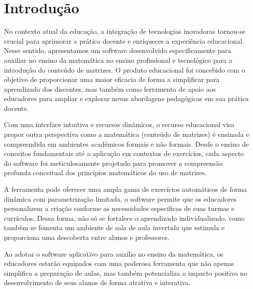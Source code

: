 \chapter{Introdução}
\label{introducao}


No contexto atual da educação, a integração de tecnologias inovadoras tornou-se crucial para aprimorar a prática docente e enriquecer a experiência educacional. Nesse sentido, apresentamos um software desenvolvido especificamente para auxiliar no ensino da matemática no ensino profissional e tecnológico para a introdução do conteúdo de matrizes. O produto educacional foi concebido com o objetivo de proporcionar uma maior eficacia de forma a simplificar para aprendizado dos discentes, mas também como ferramenta de apoio aos educadores para ampliar e explorar novas abordagens pedagógicas em sua prática docente.

Com uma interface intuitiva e recursos dinâmicos, o recurso educacional visa propor outra perspectiva como a matemática (conteúdo de matrizes) é ensinada e compreendida em ambientes acadêmicos formais e não formais. Desde o ensino de conceitos fundamentais até a aplicação em contextos de exercícios, cada aspecto do software foi meticulosamente projetado para promover a compreensão profunda conceitual dos princípios matemáticos do uso de matrizes.

A ferramenta pode oferecer uma ampla gama de exercícios automáticos de forma dinâmica com parametrização limitada, o software permite que os educadores personalizem a criação conforme as necessidades específicas de suas turmas e currículos. Dessa forma, não só se fortalece o aprendizado individualizado, como também se fomenta um ambiente de sala de aula invertida que estimula e proporciona uma descoberta entre alunos e professores.

Ao adotar o software aplicativo para auxílio no ensino da matemática, os educadores estarão equipados com uma poderosa ferramenta que não apenas simplifica a preparação de aulas, mas também potencializa o impacto positivo no desenvolvimento de seus alunos de forma atrativa e interativa.







